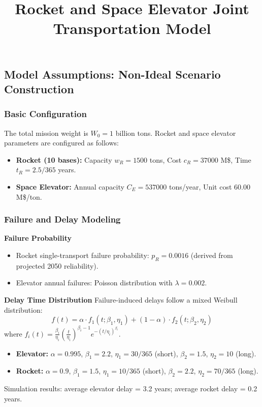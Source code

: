 \documentclass{article}
\title{Rocket and Space Elevator Joint Transportation Model}
\author{}
\date{}
\begin{document}
\maketitle

\subsection{Model Assumptions: Non-Ideal Scenario Construction}
\subsubsection{Basic Configuration}
The total mission weight is $W_0 = 1$ billion tons.
Rocket and space elevator parameters are configured as follows:
\begin{itemize}
    \item \textbf{Rocket (10 bases):} Capacity $w_R = 1500$ tons, Cost $c_R = 37000$ M\$, Time $t_R = 2.5/365$ years.
    \item \textbf{Space Elevator:} Annual capacity $C_E = 537000$ tons/year, Unit cost $60.00$ M\$/ton.
\end{itemize}

\subsubsection{Failure and Delay Modeling}
\textbf{Failure Probability}
\begin{itemize}
    \item Rocket single-transport failure probability: $p_R = 0.0016$ (derived from projected 2050 reliability).
    \item Elevator annual failures: Poisson distribution with $\lambda = 0.002$.
\end{itemize}

\textbf{Delay Time Distribution}
Failure-induced delays follow a mixed Weibull distribution:
\[
f(t) = \alpha \cdot f_{1}(t;\beta_{1},\eta_{1}) + (1 - \alpha) \cdot f_{2}(t;\beta_{2},\eta_{2})
\]
where $f_i(t) = \frac{\beta_i}{\eta_i} \left( \frac{t}{\eta_i} \right)^{\beta_i-1} e^{-(t/\eta_i)^{\beta_i}}$.
\begin{itemize}
    \item \textbf{Elevator:} $\alpha = 0.995$, $\beta_1=2.2$, $\eta_1=30/365$ (short), $\beta_2=1.5$, $\eta_2=10$ (long).
    \item \textbf{Rocket:} $\alpha = 0.9$, $\beta_1=1.5$, $\eta_1=10/365$ (short), $\beta_2=2.2$, $\eta_2=70/365$ (long).
\end{itemize}
Simulation results: average elevator delay = 3.2 years; average rocket delay = 0.2 years.
\end{document}

